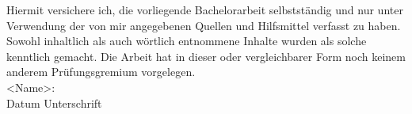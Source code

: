 \label{erklaerung}

Hiermit versichere ich, die vorliegende Bachelorarbeit selbstständig und nur unter Verwendung der von mir angegebenen Quellen und Hilfsmittel verfasst zu haben. Sowohl inhaltlich als auch wörtlich entnommene Inhalte wurden als solche kenntlich gemacht. Die Arbeit hat in dieser oder vergleichbarer Form noch keinem anderem Prüfungsgremium vorgelegen. \\

<Name>: \\[0.5cm]Datum	\hrulefill\enspace Unterschrift \hrulefill\\